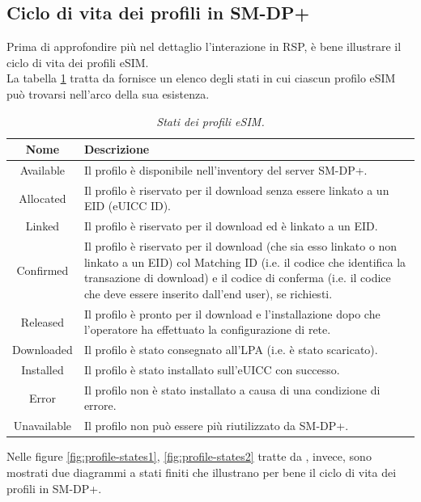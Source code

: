 \documentclass[10pt, oneside]{book}
\begin{document}
\subsection{Ciclo di vita dei profili in SM-DP+}
Prima di approfondire più nel dettaglio l'interazione in RSP, è bene illustrare il ciclo di vita dei profili eSIM.\\
La tabella \ref{tab:profile-states} tratta da \cite{GSMA-docs-new}\cite{GSMA-docs-old} fornisce un elenco degli stati in cui ciascun profilo eSIM può trovarsi nell'arco della sua esistenza.
\begin{table}[h!]
\begin{center}
\captionsetup{skip=4pt}
\caption{\textit{Stati dei profili eSIM.}}
\label{tab:profile-states}
\begin{tabularx}{\textwidth}{|c|X|}
\hline
\textbf{Nome} & \textbf{Descrizione}\\
\hline
Available & Il profilo è disponibile nell’inventory del server SM-DP+.\\
\hline
Allocated & Il profilo è riservato per il download senza essere linkato a un EID (eUICC ID).\\
\hline
Linked & Il profilo è riservato per il download ed è linkato a un EID.\\
\hline
Confirmed & Il profilo è riservato per il download (che sia esso linkato o non linkato a un EID) col Matching ID (i.e. il codice che identifica la transazione di download) e il codice di conferma (i.e. il codice che deve essere inserito dall'end user), se richiesti.\\
\hline
Released & Il profilo è pronto per il download e l’installazione dopo che l’operatore ha effettuato la configurazione di rete.\\
\hline
Downloaded & Il profilo è stato consegnato all’LPA (i.e. è stato scaricato).\\
\hline
Installed & Il profilo è stato installato sull’eUICC con successo.\\
\hline
Error & Il profilo non è stato installato a causa di una condizione di errore.\\
\hline
Unavailable & Il profilo non può essere più riutilizzato da SM-DP+.\\
\hline
\end{tabularx}
\end{center}
\end{table}
Nelle figure \ref{fig:profile-states1}, \ref{fig:profile-states2} tratte da \cite{GSMA-docs-new}\cite{GSMA-docs-old}, invece, sono mostrati due diagrammi a stati finiti che illustrano per bene il ciclo di vita dei profili in SM-DP+.
\end{document}
